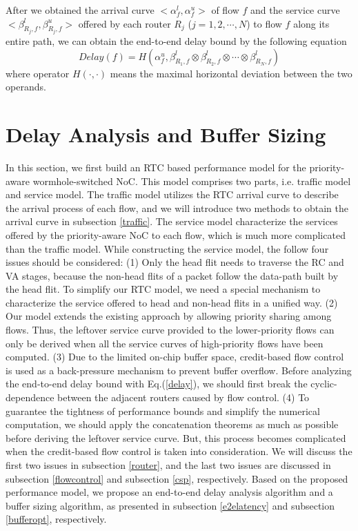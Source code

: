 \documentclass[10pt,journal]{IEEEtran}
\begin{document}
After we obtained the arrival curve $<\alpha^l_{f},\alpha^u_{f}>$ of flow $f$ and the service curve $<\beta_{R_j,f}^l,\beta_{R_j,f}^u>$ offered by each router $R_j$ ($j=1,2,\cdots,N$) to flow $f$ along its entire path, we can obtain the end-to-end delay bound by the following equation \cite{Boudec2001Network}
\begin{equation}\label{delay}
Delay(f)=H(\alpha^u_{f},\beta^l_{R_1,f}\otimes\beta^l_{R_2,f}\otimes\cdots\otimes\beta^l_{R_N,f})
\end{equation}
where operator $H(\cdot,\cdot)$ means the maximal horizontal deviation between the two operands.

\section{Delay Analysis and Buffer Sizing}\label{modeling}
In this section, we first build an RTC based performance model for the priority-aware wormhole-switched NoC. This model comprises two parts, i.e. traffic model and service model. The traffic model utilizes the RTC arrival curve to describe the arrival process of each flow, and we will introduce two methods to obtain the arrival curve in subsection \ref{traffic}. The service model characterize the services offered by the priority-aware NoC to each flow, which is much more complicated than the traffic model. While constructing the service model, the follow four issues should be considered: (1) Only the head flit needs to traverse the RC and VA stages, because the non-head flits of a packet follow the data-path built by the head flit. To simplify our RTC model, we need a special mechanism to characterize the service offered to head and non-head flits in a unified way. (2) Our model extends the existing approach \cite{73}\cite{Qian489900} by allowing priority sharing among flows. Thus, the leftover service curve provided to the lower-priority flows can only be derived when all the service curves of high-priority flows have been computed. (3) Due to the limited on-chip buffer space, credit-based flow control is used as a back-pressure mechanism to prevent buffer overflow. Before analyzing the end-to-end delay bound with Eq.(\ref{delay}), we should first break the cyclic-dependence between the adjacent routers caused by flow control. (4) To guarantee the tightness of performance bounds and simplify the numerical computation, we should apply the concatenation theorems as much as possible before deriving the leftover service curve. But, this process becomes complicated when the credit-based flow control is taken into consideration. We will discuss the first two issues in subsection \ref{router}, and the last two issues are discussed in subsection \ref{flowcontrol} and subsection \ref{csp}, respectively. Based on the proposed performance model, we propose an end-to-end delay analysis algorithm and a buffer sizing algorithm, as presented in subsection \ref{e2elatency} and subsection \ref{bufferopt}, respectively.
\end{document}
